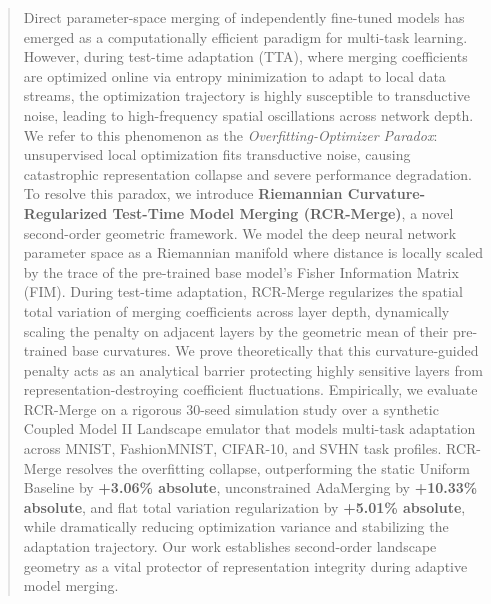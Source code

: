\begin{abstract}
Direct parameter-space merging of independently fine-tuned models has emerged as a computationally efficient paradigm for multi-task learning. However, during test-time adaptation (TTA), where merging coefficients are optimized online via entropy minimization to adapt to local data streams, the optimization trajectory is highly susceptible to transductive noise, leading to high-frequency spatial oscillations across network depth. We refer to this phenomenon as the \emph{Overfitting-Optimizer Paradox}: unsupervised local optimization fits transductive noise, causing catastrophic representation collapse and severe performance degradation. To resolve this paradox, we introduce \textbf{Riemannian Curvature-Regularized Test-Time Model Merging (RCR-Merge)}, a novel second-order geometric framework. We model the deep neural network parameter space as a Riemannian manifold where distance is locally scaled by the trace of the pre-trained base model's Fisher Information Matrix (FIM). During test-time adaptation, RCR-Merge regularizes the spatial total variation of merging coefficients across layer depth, dynamically scaling the penalty on adjacent layers by the geometric mean of their pre-trained base curvatures. We prove theoretically that this curvature-guided penalty acts as an analytical barrier protecting highly sensitive layers from representation-destroying coefficient fluctuations. Empirically, we evaluate RCR-Merge on a rigorous 30-seed simulation study over a synthetic Coupled Model II Landscape emulator that models multi-task adaptation across MNIST, FashionMNIST, CIFAR-10, and SVHN task profiles. RCR-Merge resolves the overfitting collapse, outperforming the static Uniform Baseline by \textbf{+3.06\% absolute}, unconstrained AdaMerging by \textbf{+10.33\% absolute}, and flat total variation regularization by \textbf{+5.01\% absolute}, while dramatically reducing optimization variance and stabilizing the adaptation trajectory. Our work establishes second-order landscape geometry as a vital protector of representation integrity during adaptive model merging.
\end{abstract}